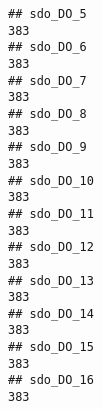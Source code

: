 \documentclass[
]{article}
\begin{document}
\begin{verbatim}
## sdo_DO_5                                                                                                                                                                                                                   383
## sdo_DO_6                                                                                                                                                                                                                   383
## sdo_DO_7                                                                                                                                                                                                                   383
## sdo_DO_8                                                                                                                                                                                                                   383
## sdo_DO_9                                                                                                                                                                                                                   383
## sdo_DO_10                                                                                                                                                                                                                  383
## sdo_DO_11                                                                                                                                                                                                                  383
## sdo_DO_12                                                                                                                                                                                                                  383
## sdo_DO_13                                                                                                                                                                                                                  383
## sdo_DO_14                                                                                                                                                                                                                  383
## sdo_DO_15                                                                                                                                                                                                                  383
## sdo_DO_16                                                                                                                                                                                                                  383

\end{verbatim}
\end{document}
